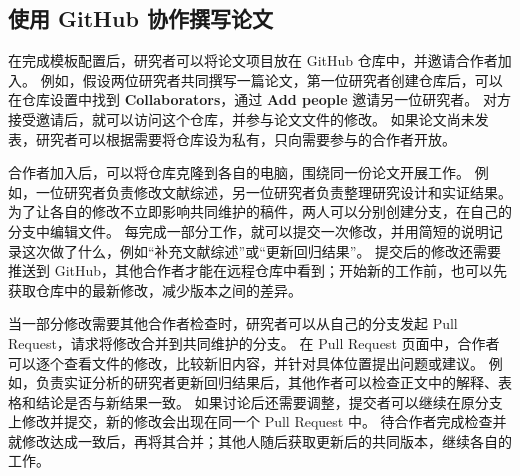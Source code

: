 \begin{center}
\begin{minipage}{\linewidth}
    \centering
    \makeatletter
    \def\@captype{figure}
    \makeatother
    \setlength{\unitlength}{1pt}
    \caption{从获取模板到生成论文的流程}
    \label{fig:template-workflow}
\end{minipage}
\end{center}

\subsection{使用 GitHub 协作撰写论文}
\label{sec:col}

在完成模板配置后，研究者可以将论文项目放在 GitHub 仓库中，并邀请合作者加入。
例如，假设两位研究者共同撰写一篇论文，第一位研究者创建仓库后，可以在仓库设置中找到 \textbf{Collaborators}，通过 \textbf{Add people} 邀请另一位研究者。
对方接受邀请后，就可以访问这个仓库，并参与论文文件的修改。
如果论文尚未发表，研究者可以根据需要将仓库设为私有，只向需要参与的合作者开放。

合作者加入后，可以将仓库克隆到各自的电脑，围绕同一份论文开展工作。
例如，一位研究者负责修改文献综述，另一位研究者负责整理研究设计和实证结果。
为了让各自的修改不立即影响共同维护的稿件，两人可以分别创建分支，在自己的分支中编辑文件。
每完成一部分工作，就可以提交一次修改，并用简短的说明记录这次做了什么，例如“补充文献综述”或“更新回归结果”。
提交后的修改还需要推送到 GitHub，其他合作者才能在远程仓库中看到；开始新的工作前，也可以先获取仓库中的最新修改，减少版本之间的差异。

当一部分修改需要其他合作者检查时，研究者可以从自己的分支发起 Pull Request，请求将修改合并到共同维护的分支。
在 Pull Request 页面中，合作者可以逐个查看文件的修改，比较新旧内容，并针对具体位置提出问题或建议。
例如，负责实证分析的研究者更新回归结果后，其他作者可以检查正文中的解释、表格和结论是否与新结果一致。
如果讨论后还需要调整，提交者可以继续在原分支上修改并提交，新的修改会出现在同一个 Pull Request 中。
待合作者完成检查并就修改达成一致后，再将其合并；其他人随后获取更新后的共同版本，继续各自的工作。

